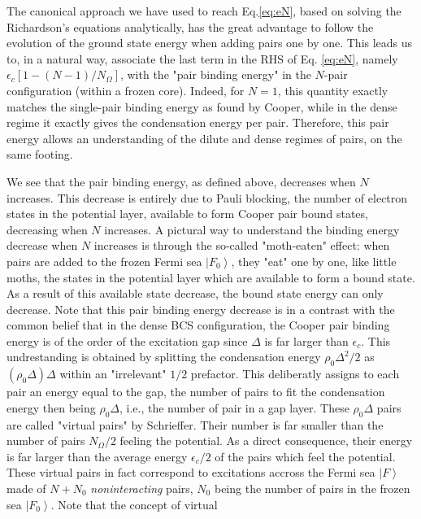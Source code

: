 \documentclass[aps,prb,superscriptaddress,twocolumn]{revtex4}
\begin{document}
The canonical approach we have used to reach Eq.\eqref{eq:eN}, based on solving the
Richardson's equations analytically, has the great advantage to follow the evolution of the
ground state energy when adding pairs one by one. This leads us to, in a natural way, associate the last term in the RHS of Eq.%
\eqref{eq:eN}, namely $\epsilon _{c}\left[ 1-\left( N-1\right) /N_{\Omega }%
\right] $, with the "pair binding energy" in the $N$-pair configuration
(within a frozen core). Indeed, for $N=1$, this quantity exactly matches the
single-pair binding energy as found by Cooper, while in the dense regime it exactly
gives the condensation energy per pair. Therefore, this pair energy
allows an understanding of the dilute and dense regimes of pairs, on the same footing.

We see that the pair binding energy, as defined
above, decreases when $N$ increases. This decrease is entirely due to
Pauli blocking, the number of electron states in
the potential layer, available to form Cooper pair bound states, decreasing when $N$ increases. 
A pictural way to
understand the binding energy decrease when $N$ increases is through the
so-called "moth-eaten" effect: when pairs are added to the frozen Fermi sea $\left\vert
F_{0}\right\rangle $, they "eat" one by one, like little moths, the
states in the potential layer which are available to form a bound state. As
a result of this available state decrease, the bound state energy can only
decrease. Note that this pair binding energy decrease is in a contrast with
the common belief that in the dense BCS configuration, the Cooper pair
binding energy is of the order of the excitation gap since  $\Delta $ is far larger
than $\epsilon _{c}$. This undrestanding is obtained by splitting the
condensation energy $\rho _{0}\Delta ^{2}/2$ as $(\rho _{0}\Delta )\Delta $
within an "irrelevant" $1/2$ prefactor. This deliberatly assigns to each pair an
energy equal to the gap, the number of pairs to fit the condensation energy
then being $\rho _{0}\Delta $, i.e., the number of pair in a gap layer. These $\rho
_{0}\Delta $ pairs are called "virtual pairs" by Schrieffer.
Their number is far smaller than the number of pairs $N_{\Omega }/2$ feeling
the potential. As a direct consequence, their energy is far larger than the average energy $%
\epsilon _{c}/2$ of the pairs which feel the potential. These virtual pairs in fact correspond
to excitations accross the Fermi sea $\left\vert F\right\rangle $ made of $%
N+N_{0}$ \textit{noninteracting} pairs, $N_{0}$ being the number of pairs in
the frozen sea $\left\vert F_{0}\right\rangle $. Note that the concept of virtual
\end{document}
